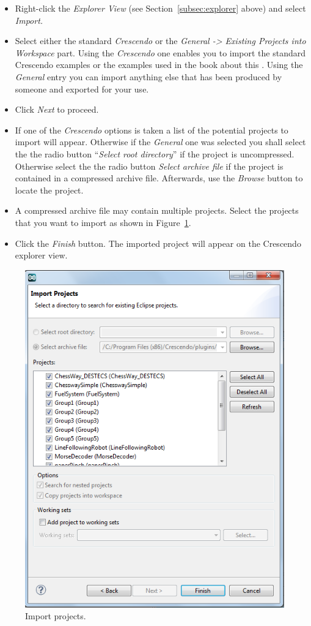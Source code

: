 \documentclass{crescendorepchap}
\begin{document}
\begin{itemize}
\item
  Right-click the \emph{Explorer View} (see Section~\ref{subsec:explorer} above)  and
  select \emph{Import.}
\item
  Select either the standard \emph{Crescendo} or the \emph{General -> Existing Projects into
  Workspace} part. Using the \emph{Crescendo} one enables you to import the standard Crescendo examples or the examples used in the book about this \cite{Fitzgerald&13a}. Using the \emph{General} entry you can import anything else that has been produced by someone and exported for your use.
\item
  Click \emph{Next} to proceed.
\item
  If one of the \emph{Crescendo} options is taken a list of the potential projects to import will appear. Otherwise if the  \emph{General} one was selected you shall select the the radio button ``\emph{Select root directory}'' if the project
  is uncompressed. Otherwise select the the radio button \emph{Select archive
  file} if the project is contained in a compressed archive file. Afterwards, use
  the \emph{Browse} button to locate the project.
\item
  A compressed archive file may contain multiple projects. Select
  the projects that you want to import as shown in Figure~\ref{fig:importproject}.
\item
  Click the \emph{Finish} button. The imported project will appear on
  the Crescendo explorer view.
\end{itemize}

\begin{figure}[htbp]
\centering
\includegraphics[width=.6\textwidth]{images/DestecsImportProject.png}
\caption{Import projects.\label{fig:importproject}}
\end{figure}
\end{document}
